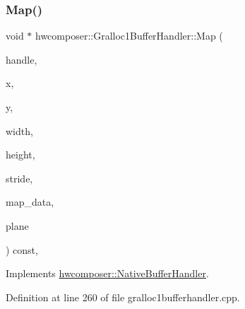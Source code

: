 \subsubsection{\texorpdfstring{Map()}{Map()}}
{\footnotesize\ttfamily void $\ast$ hwcomposer\+::\+Gralloc1\+Buffer\+Handler\+::\+Map (\begin{DoxyParamCaption}\item[{\mbox{\hyperlink{alios_2platformdefines_8h_ac0a2eaf260f556d17fe489911f017bdf}{H\+W\+C\+Native\+Handle}}}]{handle,  }\item[{uint32\+\_\+t}]{x,  }\item[{uint32\+\_\+t}]{y,  }\item[{uint32\+\_\+t}]{width,  }\item[{uint32\+\_\+t}]{height,  }\item[{uint32\+\_\+t $\ast$}]{stride,  }\item[{void $\ast$$\ast$}]{map\+\_\+data,  }\item[{size\+\_\+t}]{plane }\end{DoxyParamCaption}) const\hspace{0.3cm}{\ttfamily [override]}, {\ttfamily [virtual]}}



Implements \mbox{\hyperlink{classhwcomposer_1_1NativeBufferHandler_a4ef1e64030d28540265fac46d503e9b8}{hwcomposer\+::\+Native\+Buffer\+Handler}}.



Definition at line 260 of file gralloc1bufferhandler.\+cpp.


